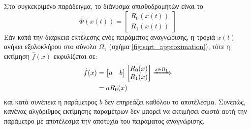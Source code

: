Στο συγκεκριμένο παράδειγμα, το διάνυσμα οπισθοδρομητών είναι το
\begin{equation*}
	\varPhi(x(t)) = \begin{bmatrix}
	R_0(x(t)) \\ R_1(x(t)) 
	\end{bmatrix}
\end{equation*}
Εάν κατά την διάρκεια εκτέλεσης ενός πειράματος αναγνώρισης, η τροχιά $x(t)$ ανήκει εξολοκλήρου στο σύνολο $\Omega_1$ (σχήμα \ref{fig:sqrt_approximation}), τότε η εκτίμηση $\hat{f}(x)$ εκφυλίζεται σε:
\begin{equation*}
\begin{split}
\hat{f}(x) &=\begin{bmatrix} a & b \end{bmatrix} 
\begin{bmatrix} R_0(x) \\ R_1(x) \end{bmatrix} \xRightarrow{x \in \Omega_1}\\
&= a R_0(x)
\end{split}
\end{equation*}
και κατά συνέπεια η παράμετρος $b$ δεν επηρεάζει καθόλου το αποτέλεσμα. Συνεπώς, κανένας αλγόριθμος εκτίμησης παραμέτρων δεν μπορεί να εκτιμήσει σωστά αυτή την παράμετρο με αποτέλεσμα την αποτυχία του πειράματος αναγνώρισης.




